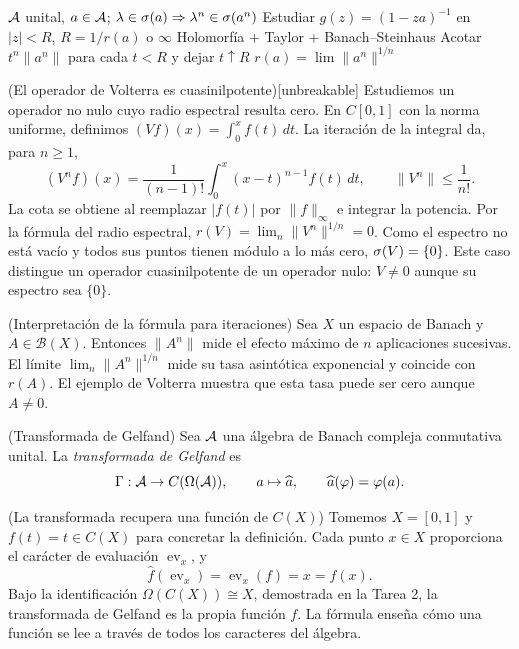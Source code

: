 \proofdiagrambranch
{$\mathcal A$ unital, $a\in\mathcal A$; $\lambda\in\sigma(a)\Rightarrow\lambda^n\in\sigma(a^n)$}
{Estudiar $g(z)=(1-za)^{-1}$ en $|z|<R$, $R=1/r(a)$ o $\infty$}
{Holomorfía + Taylor + Banach--Steinhaus}
{Acotar $t^n\|a^n\|$ para cada $t<R$ y dejar $t\uparrow R$}
{$r(a)=\lim\|a^n\|^{1/n}$}

\begin{cthejemplo}{(El operador de Volterra es cuasinilpotente)}[unbreakable]
Estudiemos un operador no nulo cuyo radio espectral resulta cero.
En $C[0,1]$ con la norma uniforme, definimos
$(Vf)(x)=\int_0^x f(t)\,dt$. La iteración de la integral da, para
$n\ge1$,
\[
 (V^nf)(x)=\frac1{(n-1)!}\int_0^x(x-t)^{n-1}f(t)\,dt,
 \qquad \|V^n\|\le\frac1{n!}.
\]
La cota se obtiene al reemplazar $|f(t)|$ por $\|f\|_\infty$
e integrar la potencia. 
Por la fórmula del radio espectral,
$r(V)=\lim_n\|V^n\|^{1/n}=0$.
Como el espectro no está vacío y todos sus puntos tienen módulo
a lo más cero, $\sigma(V)=\{0\}$.
Este caso distingue un operador cuasinilpotente de un operador nulo:
$V\ne0$ aunque su espectro sea $\{0\}$.
\end{cthejemplo}

\begin{cthnota}{(Interpretación de la fórmula para iteraciones)}
Sea $X$ un espacio de Banach y $A\in\mathcal B(X)$. Entonces $\|A^n\|$
mide el efecto máximo de $n$ aplicaciones
sucesivas. El límite $\lim_n\|A^n\|^{1/n}$ mide su tasa asintótica exponencial y
coincide con $r(A)$. El ejemplo de Volterra muestra que esta tasa puede ser cero
aunque $A\ne0$.
\end{cthnota}

\begin{cthdefinicion}{(Transformada de Gelfand)}
Sea $\mathcal A$ una álgebra de Banach compleja conmutativa unital.
La \emph{transformada de Gelfand} es
\[
 \Gamma:\mathcal A\to C(\Omega(\mathcal A)),\qquad
 a\mapsto\widehat a,\qquad \widehat a(\varphi)=\varphi(a).
\]
\end{cthdefinicion}

\begin{cthejemplo}{(La transformada recupera una función de $C(X)$)}
Tomemos $X=[0,1]$ y $f(t)=t\in C(X)$ para concretar la definición.
Cada punto $x\in X$ proporciona el carácter de evaluación
$\operatorname{ev}_x$, y
\[
 \widehat f(\operatorname{ev}_x)
 =\operatorname{ev}_x(f)=x=f(x).
\]
Bajo la identificación $\Omega(C(X))\cong X$, demostrada en la Tarea 2,
la transformada de Gelfand es la propia función $f$.
La fórmula enseña cómo una función se lee a través de todos los
caracteres del álgebra.
\end{cthejemplo}

